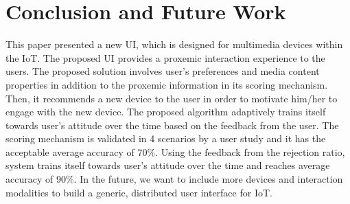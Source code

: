 \documentclass{article}
\begin{document}
\section{Conclusion and Future Work}This paper presented a new UI, which is designed for multimedia devices within the IoT. The proposed UI provides a proxemic interaction experience to the users. The proposed solution involves user's preferences and media content properties in addition to the proxemic information in its scoring mechanism. Then, it recommends a new device to the user in order to motivate him/her to engage with the new device. The proposed algorithm adaptively trains itself towards user's attitude over the time based on the feedback from the user. The scoring
mechanism is validated in 4 scenarios by a user study and it has the acceptable average accuracy of 70\%. Using the feedback from the rejection ratio, system trains itself towards user's attitude over the time and reaches average accuracy of 90\%. In the future, we want to include more devices and interaction modalities to build a generic, distributed user interface for IoT.
\end{document}
